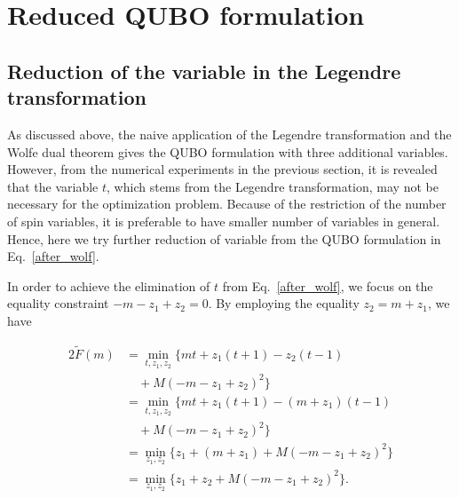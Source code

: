 \documentclass[fp,twocolumn]{jpsj3}
\begin{document}


\section{Reduced QUBO formulation} %
\subsection{Reduction of the variable in the Legendre transformation}



As discussed above, the naive application of the Legendre transformation and the Wolfe dual theorem gives the QUBO formulation with three additional variables.
However, from the numerical experiments in the previous section, it is revealed that the variable $t$, which stems from the Legendre transformation, may not be necessary for the optimization problem.
Because of the restriction of the number of spin variables, it is preferable to have smaller number of variables in general.
Hence, here we try further reduction of variable from the QUBO formulation in Eq.~\eqref{after_wolf}. 

In order to achieve the elimination of $t$ from Eq.~\eqref{after_wolf}, we focus on the equality constraint $-m-z_{1}+z_{2} = 0$.
By employing the equality $z_{2} = m+z_{1}$, we have 

\begin{alignat}{2}
  \widetilde{F}(m)&=\min_{t,z_{1},z_{2}}{\{mt+z_{1}(t+1)-z_{2}(t-1)} \nonumber \\
  &\quad+M(-m-z_{1}+z_{2})^{2}\} \nonumber \\
  &=\min_{t,z_{1},z_{2}}{\{mt+z_{1}(t+1)-(m+z_{1})(t-1)} \nonumber \\
  &\quad+M(-m-z_{1}+z_{2})^{2}\} \nonumber \\
  &=\min_{z_{1},z_{2}}{\{z_{1}+(m+z_{1})+M(-m-z_{1}+z_{2})^{2}\}} \nonumber \\
  &=\min_{z_{1},z_{2}}{\{z_{1}+z_{2}+M(-m-z_{1}+z_{2})^{2}\}}. 
\end{alignat}

\end{document}
